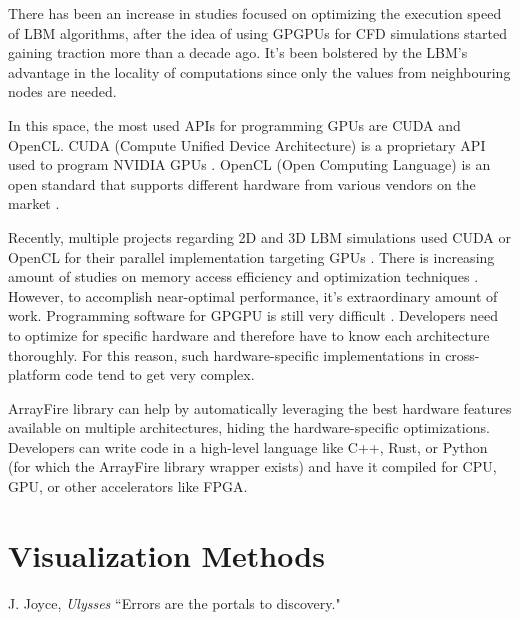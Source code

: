 There has been an increase in studies focused on optimizing the execution speed of LBM algorithms, after the idea of using GPGPUs for CFD simulations started gaining traction more than a decade ago. It's been bolstered by the LBM's advantage in the locality of computations since only the values from neighbouring nodes are needed. 

In this space, the most used APIs for programming GPUs are CUDA and OpenCL. CUDA (Compute Unified Device Architecture) is a proprietary API used to program NVIDIA GPUs \cite{stortiCUDAEngineersIntroduction2016}. OpenCL (Open Computing Language) is an open standard that supports different hardware from various vendors on the market \cite{karimiPerformanceComparisonCUDA}.

Recently, multiple projects regarding 2D and 3D LBM simulations used CUDA or OpenCL for their parallel implementation targeting GPUs \cite{delboscRealTimeSimulationIndoor, delboscOptimizedImplementationLattice2014,  januszewskiSailfishFlexibleMultiGPU2014, boroniFULLGPUImplementation2017, kotsalosDigitalBloodMassively2019, kolihaOnlineVisualizationInteractive2015, szokePerformanceEvaluationTwoDimensional2017, harwoodLUMAManycoreFluid2018, harwoodParallelisationInteractiveLatticeBoltzmann2017}. There is increasing amount of studies on memory access efficiency and optimization techniques \cite{herschlagGPUDataAccess2018, tranPerformanceOptimization3D2017}. However, to accomplish near-optimal performance, it's extraordinary amount of work. Programming software for GPGPU is still very difficult \cite{amalcolmArrayFireGPUAcceleration2012a}. Developers need to optimize for specific hardware and therefore have to know each architecture thoroughly. For this reason, such hardware-specific implementations in cross-platform code tend to get very complex.

ArrayFire library can help by automatically leveraging the best hardware features available on multiple architectures, hiding the hardware-specific optimizations. Developers can write code in a high-level language like C++, Rust, or Python (for which the ArrayFire library wrapper exists) and have it compiled for CPU, GPU, or other accelerators like FPGA.


\section{Visualization Methods}\label{sec:vizmethods}
\begin{chapquote}{J. Joyce, \textit{Ulysses}}
	``Errors are the portals to discovery."
\end{chapquote}


